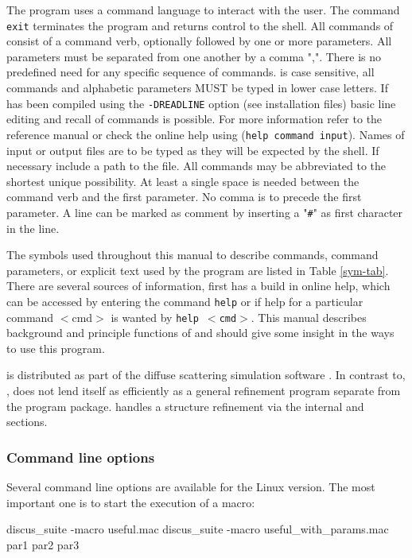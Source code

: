 The program uses a command language to interact with the user.  The
command {\tt exit} terminates the program and returns control to the
shell.  All commands of \Suite consist of a command verb,
optionally followed by one or more parameters.  All parameters must
be separated from one another by a comma ",".  There is no
predefined need for any specific sequence of commands.  \Suite     
is case sensitive, all commands and alphabetic parameters MUST be
typed in lower case letters.  If \Suite has been compiled
using the {\tt -DREADLINE} option (see installation files) basic
line editing and recall of commands is possible.  For more
information refer to the reference manual or check the online help
using ({\tt help command input}).  Names of input or output files
are to be typed as they will be expected by the shell.  If necessary
include a path to the file.  All commands may be abbreviated to the
shortest unique possibility. At least a single space is needed
between the command verb and the first parameter.  No comma is to
precede the first parameter. A line can be marked as comment by
inserting a "{\tt \#}" as first character in the line.\par

The symbols used throughout this manual to describe commands,
command parameters, or explicit text used by the program \Suite     
are listed in Table \ref{sym-tab}. There are several sources
of information, first \Suite  has a build in online help, which
can be accessed by entering the command {\tt help} or if help for a
particular command $<$cmd$>$ is wanted by {\tt help $<$cmd$>$}. This
manual describes background and principle functions of \Suite
and should give some insight in the ways to use this program. \par

\Suite is distributed as part of the diffuse scattering
simulation software \discus.  In contrast to, \diffev, \Suite
does not lend itself as efficiently as a general refinement program 
separate from the \Discus program package. \Suite handles a 
structure refinement via the internal \Discus and \Kuplot sections.

\subsubsection{Command line options \label{intro-cmd}}
Several command line options are available for the Linux version.
The most important one is to start the execution of a macro:

\begin{MacVerbatim}
discus_suite -macro useful.mac
discus_suite -macro useful_with_params.mac  par1 par2 par3
\end{MacVerbatim}

